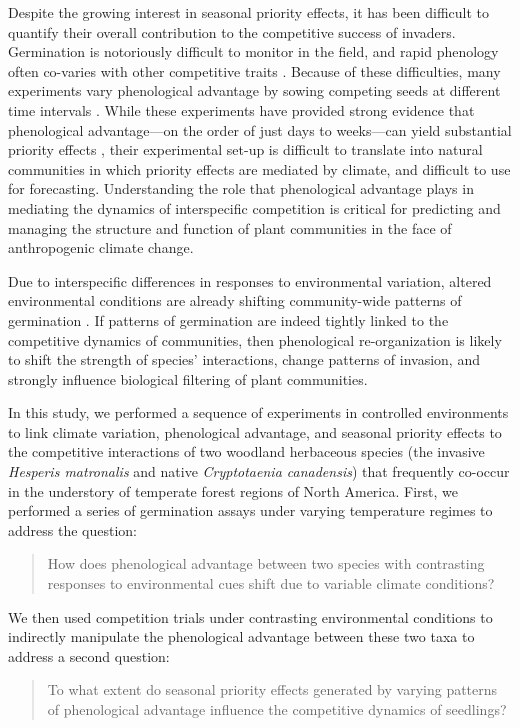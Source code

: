 \documentclass{article}[11pt]
\begin{document}
Despite the growing interest in seasonal priority effects, it has been difficult to quantify their overall contribution to the competitive success of invaders. Germination is notoriously difficult to monitor in the field, and rapid phenology often co-varies with other competitive traits \citep{Dickson2012,Milbau:2003vt,HAO:2009vh}. Because of these difficulties, many experiments vary phenological advantage by sowing competing seeds at different time intervals \citep{Young:2017aa}. While these experiments have provided strong evidence that phenological advantage---on the order of just days to weeks---can yield substantial priority effects \citep{Weidlich:2020aa}, their experimental set-up is difficult to translate into natural communities in which priority effects are mediated by climate, and difficult to use for forecasting. Understanding the role that phenological advantage plays in mediating the dynamics of interspecific competition is critical for predicting and managing the structure and function of plant communities in the face of anthropogenic climate change. 

Due to interspecific differences in responses to environmental variation, altered environmental conditions are already shifting community-wide patterns of germination \citep{Walck2011}. If patterns of germination are indeed tightly linked to the competitive dynamics of communities, then phenological re-organization is likely to shift the strength of species' interactions, change patterns of invasion, and strongly influence biological filtering of plant communities. 

In this study, we performed a sequence of experiments in controlled environments to link climate variation, phenological advantage, and seasonal priority effects to the competitive interactions of two woodland herbaceous species (the invasive \textit{Hesperis matronalis} and native \textit{Cryptotaenia canadensis}) that frequently co-occur in the understory of temperate forest regions of North America. First, we performed a series of germination assays under varying temperature regimes to address the question: 
\begin{quote}How does phenological advantage between two species with contrasting responses to environmental cues shift due to variable climate conditions?\end{quote}
We then used competition trials under contrasting environmental conditions to indirectly manipulate the phenological advantage between these two taxa to address a second question: \begin{quote}To what extent do seasonal priority effects generated by varying patterns of phenological advantage influence the competitive dynamics of seedlings?\end{quote}
\end{document}
